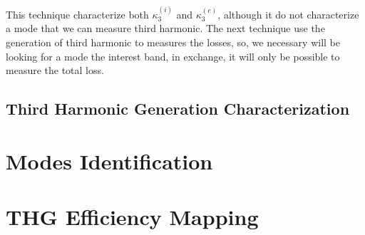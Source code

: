 This technique characterize both $\kappa_3^{(i)}$ and $\kappa_3^{(e)}$, although it do not characterize a mode that we can measure third harmonic. The next technique use the generation of third harmonic to measures the losses, so, we necessary will be looking for a mode the interest band, in exchange, it will only be possible to measure the total loss. 

\subsection{Third Harmonic Generation Characterization}




\section{Modes Identification}

\section{THG Efficiency Mapping}
